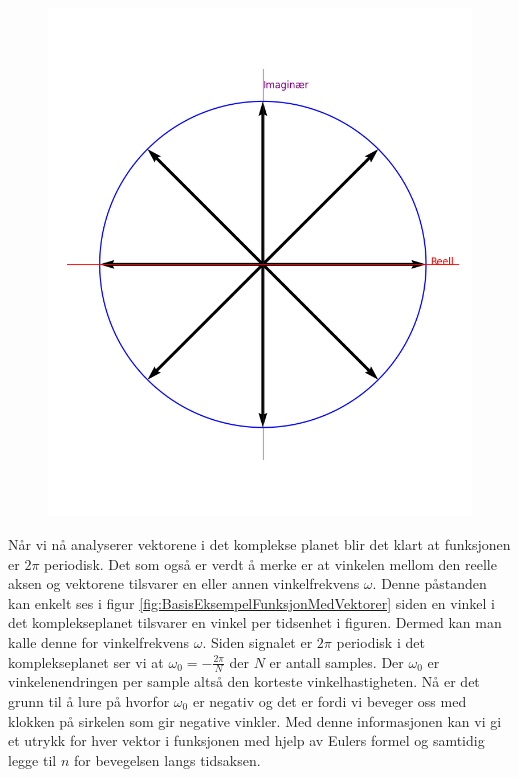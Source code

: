 \documentclass{article}
\begin{document}
\begin{figure}[H]
\begin{minipage}[c]{0.45\textwidth}
                    \includegraphics[width = 1\textwidth]{Bilder/KomplekseplanetMedVektorer.png}
                    \caption{}
                \end{minipage}
            \end{figure}

            Når vi nå analyserer vektorene i det komplekse planet blir det klart at funksjonen er \(2\pi\) periodisk.
            Det som også er verdt å merke er at vinkelen mellom den reelle aksen og vektorene tilsvarer en eller annen vinkelfrekvens \(\omega\).
            Denne påstanden kan enkelt ses i figur \ref{fig:BasisEksempelFunksjonMedVektorer} siden en vinkel i det komplekseplanet tilsvarer en vinkel per tidsenhet i figuren.
            Dermed kan man kalle denne for vinkelfrekvens \(\omega\). 
            Siden signalet er \(2\pi\) periodisk i det komplekseplanet ser vi at \(\omega_0 = -\frac{2\pi}{N}\) der \(N\) er antall samples.
            Der \(\omega_0\) er vinkelenendringen per sample altså den korteste vinkelhastigheten.
            Nå er det grunn til å lure på hvorfor \(\omega_0\) er negativ og det er fordi vi beveger oss med klokken på sirkelen som gir negative vinkler.
            Med denne informasjonen kan vi gi et utrykk for hver vektor i funksjonen med hjelp av Eulers formel og samtidig legge til \(n\) for bevegelsen langs tidsaksen.
\end{document}
